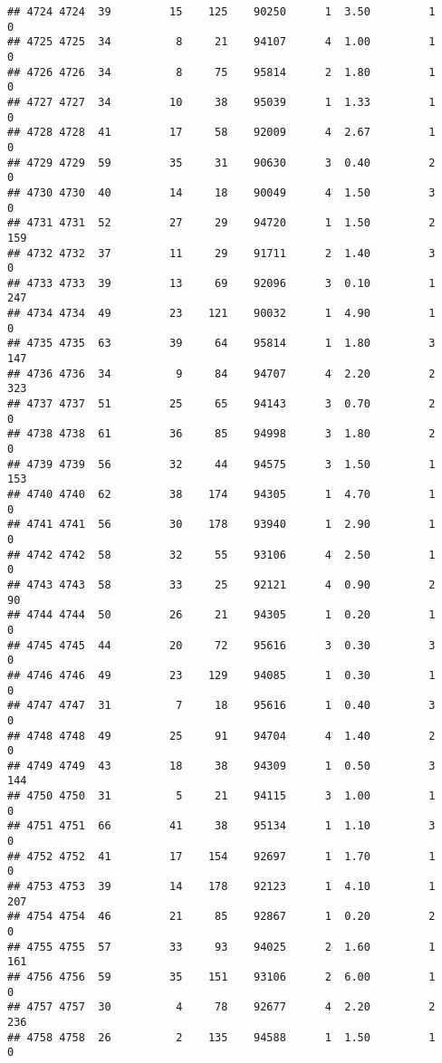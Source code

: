\documentclass[
]{article}
\begin{document}
\begin{verbatim}
## 4724 4724  39         15    125    90250      1  3.50         1        0
## 4725 4725  34          8     21    94107      4  1.00         1        0
## 4726 4726  34          8     75    95814      2  1.80         1        0
## 4727 4727  34         10     38    95039      1  1.33         1        0
## 4728 4728  41         17     58    92009      4  2.67         1        0
## 4729 4729  59         35     31    90630      3  0.40         2        0
## 4730 4730  40         14     18    90049      4  1.50         3        0
## 4731 4731  52         27     29    94720      1  1.50         2      159
## 4732 4732  37         11     29    91711      2  1.40         3        0
## 4733 4733  39         13     69    92096      3  0.10         1      247
## 4734 4734  49         23    121    90032      1  4.90         1        0
## 4735 4735  63         39     64    95814      1  1.80         3      147
## 4736 4736  34          9     84    94707      4  2.20         2      323
## 4737 4737  51         25     65    94143      3  0.70         2        0
## 4738 4738  61         36     85    94998      3  1.80         2        0
## 4739 4739  56         32     44    94575      3  1.50         1      153
## 4740 4740  62         38    174    94305      1  4.70         1        0
## 4741 4741  56         30    178    93940      1  2.90         1        0
## 4742 4742  58         32     55    93106      4  2.50         1        0
## 4743 4743  58         33     25    92121      4  0.90         2       90
## 4744 4744  50         26     21    94305      1  0.20         1        0
## 4745 4745  44         20     72    95616      3  0.30         3        0
## 4746 4746  49         23    129    94085      1  0.30         1        0
## 4747 4747  31          7     18    95616      1  0.40         3        0
## 4748 4748  49         25     91    94704      4  1.40         2        0
## 4749 4749  43         18     38    94309      1  0.50         3      144
## 4750 4750  31          5     21    94115      3  1.00         1        0
## 4751 4751  66         41     38    95134      1  1.10         3        0
## 4752 4752  41         17    154    92697      1  1.70         1        0
## 4753 4753  39         14    178    92123      1  4.10         1      207
## 4754 4754  46         21     85    92867      1  0.20         2        0
## 4755 4755  57         33     93    94025      2  1.60         1      161
## 4756 4756  59         35    151    93106      2  6.00         1        0
## 4757 4757  30          4     78    92677      4  2.20         2      236
## 4758 4758  26          2    135    94588      1  1.50         1        0

\end{verbatim}
\end{document}
